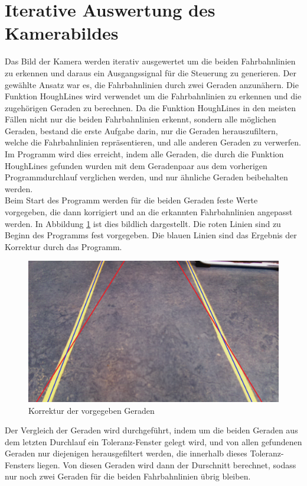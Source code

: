 \section{Iterative Auswertung des Kamerabildes}	

	Das Bild der Kamera werden iterativ ausgewertet um die beiden Fahrbahnlinien zu erkennen und daraus ein Ausgangssignal für die Steuerung zu generieren. Der gewählte Ansatz war es, die Fahrbahnlinien durch zwei Geraden anzunähern. Die Funktion HoughLines wird verwendet um die Fahrbahnlinien zu erkennen und die zugehörigen Geraden zu berechnen. Da die Funktion HoughLines in den meisten Fällen nicht nur die beiden Fahrbahnlinien erkennt, sondern alle möglichen Geraden, bestand die erste Aufgabe darin, nur die Geraden herauszufiltern, welche die Fahrbahnlinien repräsentieren, und alle anderen Geraden zu verwerfen. Im Programm wird dies erreicht, indem alle Geraden, die durch die Funktion HoughLines gefunden wurden mit dem Geradenpaar aus dem vorherigen Programmdurchlauf verglichen werden, und nur ähnliche Geraden beibehalten werden.\\
	
	Beim Start des Programm werden für die beiden Geraden feste Werte vorgegeben, die dann korrigiert und an die erkannten Fahrbahnlinien angepasst werden. In Abbildung \ref{fig:fahrbahn} ist dies bildlich dargestellt. Die roten Linien sind zu Beginn des Programms fest vorgegeben. Die blauen Linien sind das Ergebnis der Korrektur durch das Programm.
	
	\begin{figure}[H]
		\centering
		\includegraphics[width=.5\linewidth]{images/fahrbahn.png}
		\caption{Korrektur der vorgegeben Geraden}
		\label{fig:fahrbahn}
	\end{figure}
	
	
	Der Vergleich der Geraden wird durchgeführt, indem um die beiden Geraden aus dem letzten Durchlauf ein Toleranz-Fenster gelegt wird, und von allen gefundenen Geraden nur diejenigen herausgefiltert werden, die innerhalb dieses Toleranz-Fensters liegen. Von diesen Geraden wird dann der Durschnitt berechnet, sodass nur noch zwei Geraden für die beiden Fahrbahnlinien übrig bleiben. \\
	
